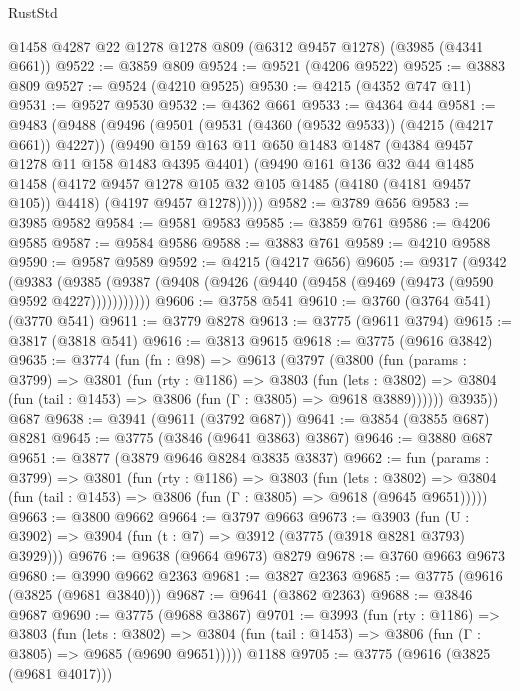 \begin{lexlean}{RustStd}
\begin{coremodule}
{\begin{coremodule}
{{{{{{{{{{{{{{{{{{{{{{{{{{{{{{{    @1458
    @4287
    @22
    @1278
    @1278
    @809
    (@6312 @9457 @1278)
    (@3985 (@4341 @661))
@9522 := @3859 @809
@9524 := @9521 (@4206 @9522)
@9525 := @3883 @809
@9527 := @9524 (@4210 @9525)
@9530 := @4215 (@4352 @747 @11)
@9531 := @9527 @9530
@9532 := @4362 @661
@9533 := @4364 @44
@9581 := @9483
    (@9488
      (@9496
        (@9501 (@9531 (@4360 (@9532 @9533)) (@4215 (@4217 @661)) @4227))
        (@9490
          @159
          @163
          @11
          @650
          @1483
          @1487
          (@4384 @9457 @1278 @11 @158 @1483 @4395 @4401)
          (@9490
            @161
            @136
            @32
            @44
            @1485
            @1458
            (@4172 @9457 @1278 @105 @32 @105 @1485 (@4180 (@4181 @9457 @105)) @4418)
            (@4197 @9457 @1278)))))
@9582 := @3789 @656
@9583 := @3985 @9582
@9584 := @9581 @9583
@9585 := @3859 @761
@9586 := @4206 @9585
@9587 := @9584 @9586
@9588 := @3883 @761
@9589 := @4210 @9588
@9590 := @9587 @9589
@9592 := @4215 (@4217 @656)
@9605 := @9317
    (@9342
      (@9383 (@9385 (@9387 (@9408 (@9426 (@9440 (@9458 (@9469 (@9473 (@9590 @9592 @4227)))))))))))
@9606 := @3758 @541
@9610 := @3760 (@3764 @541) (@3770 @541)
@9611 := @3779 @8278
@9613 := @3775 (@9611 @3794)
@9615 := @3817 (@3818 @541)
@9616 := @3813 @9615
@9618 := @3775 (@9616 @3842)
@9635 := @3774
    (fun (fn : @98) =>
    @9613
      (@3797
        (@3800
          (fun (params : @3799) =>
          @3801
            (fun (rty : @1186) =>
            @3803
              (fun (lets : @3802) =>
              @3804 (fun (tail : @1453) => @3806 (fun (Γ : @3805) => @9618 @3889))))))
        @3935))
    @687
@9638 := @3941 (@9611 (@3792 @687))
@9641 := @3854 (@3855 @687) @8281
@9645 := @3775 (@3846 (@9641 @3863) @3867)
@9646 := @3880 @687
@9651 := @3877 (@3879 @9646 @8284 @3835 @3837)
@9662 := fun (params : @3799) =>
  @3801
    (fun (rty : @1186) =>
    @3803
      (fun (lets : @3802) =>
      @3804 (fun (tail : @1453) => @3806 (fun (Γ : @3805) => @9618 (@9645 @9651)))))
@9663 := @3800 @9662
@9664 := @3797 @9663
@9673 := @3903 (fun (U : @3902) => @3904 (fun (t : @7) => @3912 (@3775 (@3918 @8281 @3793) @3929)))
@9676 := @9638 (@9664 @9673) @8279
@9678 := @3760 @9663 @9673
@9680 := @3990 @9662 @2363
@9681 := @3827 @2363
@9685 := @3775 (@9616 (@3825 (@9681 @3840)))
@9687 := @9641 (@3862 @2363)
@9688 := @3846 @9687
@9690 := @3775 (@9688 @3867)
@9701 := @3993
    (fun (rty : @1186) =>
    @3803
      (fun (lets : @3802) =>
      @3804 (fun (tail : @1453) => @3806 (fun (Γ : @3805) => @9685 (@9690 @9651)))))
    @1188
@9705 := @3775 (@9616 (@3825 (@9681 @4017)))
}}}}}}}}}}}}}}}}}}}}}}}}}}}}}}}
\end{coremodule}}
\end{coremodule}
\end{lexlean}
